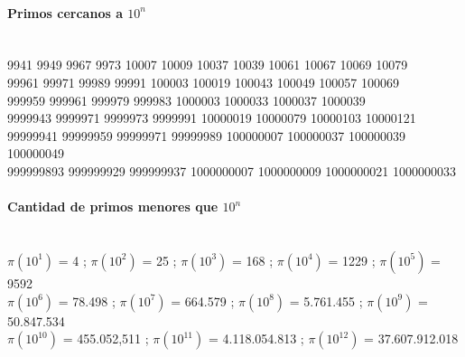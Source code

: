 \paragraph{Primos cercanos a $10^n$}\ \\
9941 9949 9967 9973 10007 10009 10037 10039 10061 10067 10069 10079\\
99961 99971 99989 99991 100003 100019 100043 100049 100057 100069\\
999959 999961 999979 999983 1000003 1000033 1000037 1000039\\
9999943 9999971 9999973 9999991 10000019 10000079 10000103 10000121\\
99999941 99999959 99999971 99999989 100000007 100000037 100000039 100000049\\
999999893 999999929 999999937 1000000007 1000000009 1000000021 1000000033
 
\paragraph{Cantidad de primos menores que $10^n$}\ \\
$\pi(10^1)$ = 4 ;
$\pi(10^2)$ = 25 ;
$\pi(10^3)$ = 168 ;
$\pi(10^4)$ = 1229 ;
$\pi(10^5)$ = 9592 \\
$\pi(10^6)$ = 78.498 ;
$\pi(10^7)$ = 664.579 ;
$\pi(10^8)$ = 5.761.455 ;
$\pi(10^9)$ = 50.847.534 \\
$\pi(10^{10})$ = 455.052,511 ;
$\pi(10^{11})$ = 4.118.054.813 ;
$\pi(10^{12})$ = 37.607.912.018%
%
%
%

